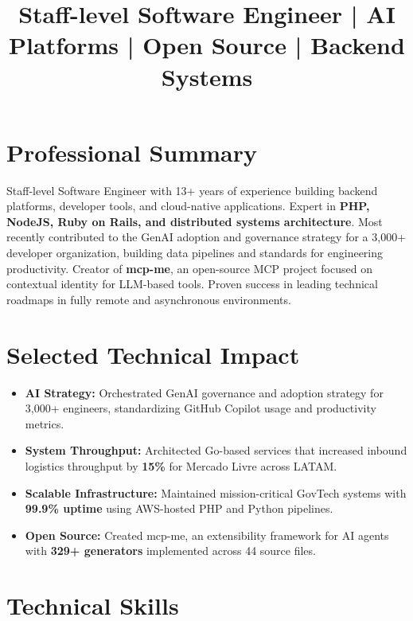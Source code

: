 \documentclass[11pt,a4paper,sans]{moderncv}
\title{Staff-level Software Engineer | AI Platforms | Open Source | Backend Systems}
\begin{document}
\makecvtitle

\vspace{-2.5em}

\section{Professional Summary}
Staff-level Software Engineer with 13+ years of experience building backend platforms, developer tools, and cloud-native applications. Expert in \textbf{PHP, NodeJS, Ruby on Rails, and distributed systems architecture}. Most recently contributed to the GenAI adoption and governance strategy for a 3,000+ developer organization, building data pipelines and standards for engineering productivity. Creator of \textbf{mcp-me}, an open-source MCP project focused on contextual identity for LLM-based tools. Proven success in leading technical roadmaps in fully remote and asynchronous environments.

\vspace{1.5ex}

\section{Selected Technical Impact}
\begin{itemize}
    \item \textbf{AI Strategy:} Orchestrated GenAI governance and adoption strategy for 3,000+ engineers, standardizing GitHub Copilot usage and productivity metrics.
    \item \textbf{System Throughput:} Architected Go-based services that increased inbound logistics throughput by \textbf{15\%} for Mercado Livre across LATAM.
    \item \textbf{Scalable Infrastructure:} Maintained mission-critical GovTech systems with \textbf{99.9\% uptime} using AWS-hosted PHP and Python pipelines.
    \item \textbf{Open Source:} Created mcp-me, an extensibility framework for AI agents with \textbf{329+ generators} implemented across 44 source files.
\end{itemize}

\vspace{1.5ex}

\section{Technical Skills}
\end{document}
